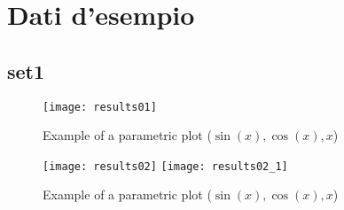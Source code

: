 
	\section{Dati d'esempio}
	\subsection{set1}




\begin{figure}[h]
\caption{Example of a parametric plot ($\sin (x), \cos(x), x$)}

	\texttt{[image: results01]}

\end{figure}

\begin{figure}[h]
\caption{Example of a parametric plot ($\sin (x), \cos(x), x$)}

	\texttt{[image: results02]}
	\hspace{1cm}
	\texttt{[image: results02\_1]}

\end{figure}



	\newpage